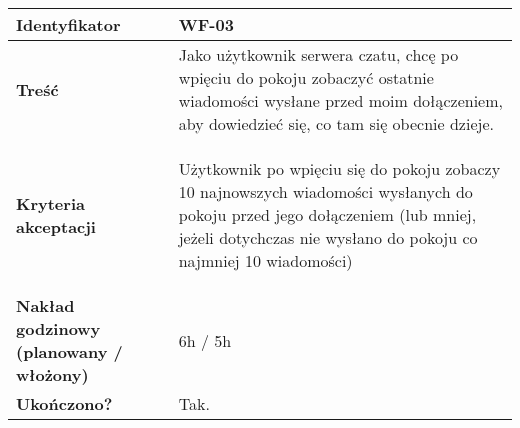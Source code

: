 \vspace{1em}

\begin{tabular}{ | l | l | }
 \hline
   \textbf{Identyfikator} &
   WF-03
   \\

 \hline
   \textbf{Treść} & \parbox[t]{11.5cm}{\strut
     Jako użytkownik serwera czatu, chcę po wpięciu
     do pokoju zobaczyć ostatnie wiadomości wysłane
     przed moim dołączeniem, aby dowiedzieć się, co
     tam się obecnie dzieje.
   \strut}\\

 \hline
   \parbox[t]{4cm}{\textbf{Kryteria akceptacji}} & \parbox[t]{11.5cm}{\strut
     \begin{enumreq}
       \item Użytkownik po wpięciu się do pokoju zobaczy
       10 najnowszych wiadomości wysłanych do pokoju
       przed jego dołączeniem (lub mniej, jeżeli
       dotychczas nie wysłano do pokoju co najmniej
       10 wiadomości)
     \end{enumreq}
     \strut}
   \\

   \hline
     \parbox[t]{4cm}{\textbf{Nakład godzinowy (planowany / włożony)}} &
     \parbox[t]{11.5cm}{\strut
       6h / 5h
     \strut}\\

 \hline
   \parbox[t]{4cm}{\textbf{Ukończono?}} &
   \parbox[t]{11.5cm}{\strut
     Tak.
   \strut}\\

   \hline
\end{tabular}

\vspace{1em}

